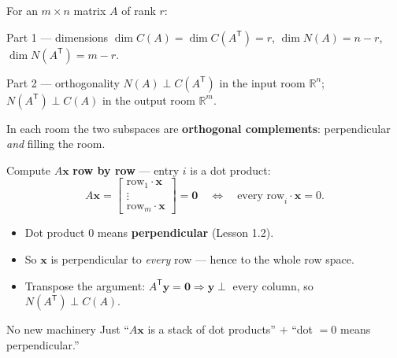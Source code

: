 \documentclass[aspectratio=169, 11pt]{beamer}
\newcommand{\xx}{\mathbf{x}}
\newcommand{\yy}{\mathbf{y}}
\newcommand{\zero}{\mathbf{0}}
\newcommand{\T}{\mathsf{T}}
\begin{document}
\begin{frame}[t, plain]
  For an $m\times n$ matrix $A$ of rank $r$:
  \begin{block}{Part 1 --- dimensions}
    $\dim C(A)=\dim C(A^{\T})=r$, \quad $\dim N(A)=n-r$, \quad $\dim N(A^{\T})=m-r$.
  \end{block}
  \begin{block}{Part 2 --- orthogonality}
    $N(A)\perp C(A^{\T})$ in the input room $\mathbb{R}^n$; \quad $N(A^{\T})\perp C(A)$ in the output room $\mathbb{R}^m$.
  \end{block}
  \vspace{2pt}
  In each room the two subspaces are \textbf{orthogonal complements}: perpendicular \emph{and} filling the room.
\end{frame}

\begin{frame}[t, plain]
  Compute $A\xx$ \textbf{row by row} --- entry $i$ is a dot product:
  \[
    A\xx=\begin{bmatrix}\text{row}_1\cdot\xx\\ \vdots \\ \text{row}_m\cdot\xx\end{bmatrix}
    =\zero \quad\Longleftrightarrow\quad \text{every row}_i\cdot\xx=0.
  \]
  \begin{itemize}
    \setlength{\itemsep}{4pt}
    \item Dot product $0$ means \textbf{perpendicular} (Lesson 1.2).
    \item So $\xx$ is perpendicular to \emph{every} row --- hence to the whole row space.
    \item Transpose the argument: $A^{\T}\yy=\zero \Rightarrow \yy\perp$ every column, so $N(A^{\T})\perp C(A)$.
  \end{itemize}
  \begin{block}{No new machinery}
    Just ``$A\xx$ is a stack of dot products'' $+$ ``dot $=0$ means perpendicular.''
  \end{block}
\end{frame}
\end{document}
